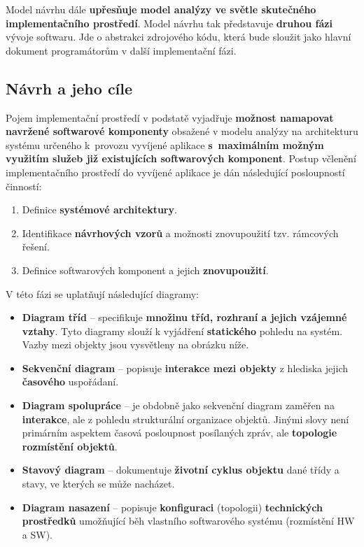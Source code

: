 Model návrhu dále \textbf{upřesňuje model analýzy ve světle skutečného implementačního prostředí}. Model návrhu tak představuje \textbf{druhou fázi} vývoje softwaru. Jde o abstrakci zdrojového kódu, která bude sloužit jako hlavní dokument programátorům v další implementační fázi.

\subsection{Návrh a jeho cíle}
Pojem implementační prostředí v podstatě vyjadřuje \textbf{možnost namapovat navržené softwarové komponenty} obsažené v modelu analýzy na architekturu systému určeného k provozu vyvíjené aplikace \textbf{s maximálním možným využitím služeb již existujících softwarových komponent}. Postup včlenění implementačního prostředí do vyvíjené aplikace je dán následující posloupností činností:
\begin{enumerate}
\item Definice \textbf{systémové architektury}.
\item Identifikace \textbf{návrhových vzorů} a možnosti znovupoužití tzv. rámcových řešení.
\item Definice softwarových komponent a jejich \textbf{znovupoužití}.
\end{enumerate}
V této fázi se uplatňují následující diagramy:

\begin{itemize}
\item \textbf{Diagram tříd} -- specifikuje \textbf{množinu tříd, rozhraní a jejich vzájemné vztahy}. Tyto diagramy slouží k vyjádření \textbf{statického} pohledu na systém. Vazby mezi objekty jsou vysvětleny na obrázku níže.
\item \textbf{Sekvenční diagram} -- popisuje \textbf{interakce mezi objekty} z hlediska jejich \textbf{časového} uspořádaní.
\item \textbf{Diagram spolupráce} -- je obdobně jako sekvenční diagram zaměřen na \textbf{interakce}, ale {z pohledu strukturální organizace objektů}. Jinými slovy není primárním aspektem časová posloupnost posílaných zpráv, ale \textbf{topologie rozmístění objektů}.
\item \textbf{Stavový diagram} -- dokumentuje \textbf{životní cyklus objektu} dané třídy a stavy, ve kterých se může nacházet.
\item \textbf{Diagram nasazení} -- popisuje \textbf{konfiguraci} (topologii) \textbf{technických prostředků} umožňující běh vlastního softwarového systému (rozmístění HW a SW).
\end{itemize}

